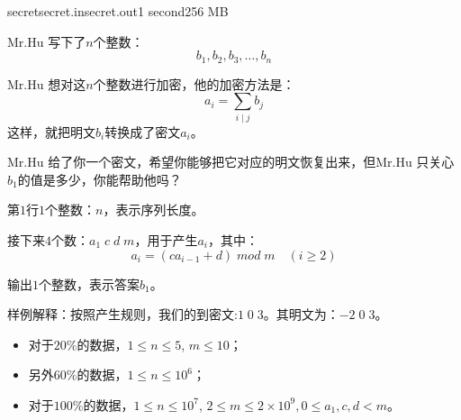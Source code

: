\documentclass[11pt,a4paper,oneside]{article}
\begin{document}
\begin{problem}{secret}{secret.in}{secret.out}{1 second}{256 MB}
    
    Mr.Hu 写下了$n$个整数：
    $$
	    b_1, b_2, b_3, \dots, b_n
    $$
    
    Mr.Hu 想对这$n$个整数进行加密，他的加密方法是：
    $$
	    a_i = \sum_{i \mid j} b_j
    $$
    这样，就把明文$b_i$转换成了密文$a_i$。
    
    Mr.Hu 给了你一个密文，希望你能够把它对应的明文恢复出来，但Mr.Hu 只关心$b_1$的值是多少，你能帮助他吗？
    
    \InputFile
    
    第$1$行$1$个整数：$n$，表示序列长度。
	   
	接下来$4$个数：$a_1 \; c \; d \; m$，用于产生$a_i$，其中：
	$$
		a_i = (ca_{i - 1} + d) \; mod \; m \quad (i \geq 2)
	$$
    
    \OutputFile
    
    输出$1$个整数，表示答案$b_1$。
    
    \Example
    \begin{example}
	\end{example}
	
	样例解释：按照产生规则，我们的到密文:$1 \; 0 \; 3$。其明文为：$-2 \; 0 \; 3$。
	
	\Note

	\begin{itemize}
		\item 对于$20\%$的数据，$1 \leq n \leq 5$, $m \leq 10$；
		\item 另外$60\%$的数据，$1 \leq n \leq 10^6$；
		\item 对于$100\%$的数据，$1 \leq n \leq 10^7$, $2 \leq m \leq 2 \times 10^9, 0 \leq a_1, c, d < m$。
	\end{itemize}
\end{problem}
\end{document}
